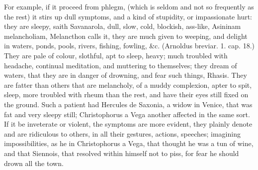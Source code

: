 {For example, if it proceed from phlegm, (which is seldom and not so
frequently as the rest) it stirs up dull symptoms, and a kind of
stupidity, or impassionate hurt: they are sleepy, saith
Savanarola, dull, slow, cold, blockish, ass-like, Asininam
melancholiam,  Melancthon calls it, they are much given to
weeping, and delight in waters, ponds, pools, rivers, fishing, fowling,
\&c. (Arnoldus breviar. 1. cap. 18.) They are pale of colour,
slothful, apt to sleep, heavy; much troubled with headache,
continual meditation, and muttering to themselves; they dream of
waters, that they are in danger of drowning, and fear such
things, Rhasis. They are fatter than others that are melancholy, of a
muddy complexion, apter to spit,  sleep, more troubled with rheum
than the rest, and have their eyes still fixed on the ground. Such a
patient had Hercules de Saxonia, a widow in Venice, that was fat and
very sleepy still; Christophorus a Vega another affected in the same
sort. If it be inveterate or violent, the symptoms are more evident,
they plainly denote and are ridiculous to others, in all their
gestures, actions, speeches; imagining impossibilities, as he in
Christophorus a Vega, that thought he was a tun of wine, and that
Siennois, that resolved within himself not to piss, for fear he should
drown all the town.

}

